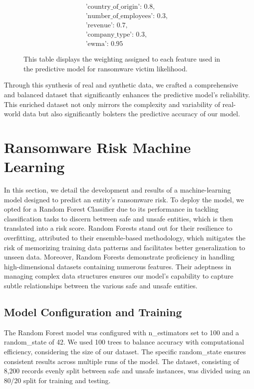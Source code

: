 \documentclass[running heads]{llncs}
\begin{document}
\begin{figure}[ht]
\centering
\[
\begin{array}{l}
\text{{'country\_of\_origin': }} 0.8, \\
\text{{'number\_of\_employees': }} 0.3, \\
\text{{'revenue': }} 0.7, \\
\text{{'company\_type': }} 0.3, \\
\text{{'ewma': }} 0.95
\end{array}
\]
\caption[Dataset Feature Weights]{This table displays the weighting assigned to each feature used in the predictive model for ransomware victim likelihood.}
  \label{tab:feature_weights}
\end{figure}

Through this synthesis of real and synthetic data, we crafted a comprehensive and balanced dataset that significantly enhances the predictive model's reliability. This enriched dataset not only mirrors the complexity and variability of real-world data but also significantly bolsters the predictive accuracy of our model. 

\section{Ransomware Risk Machine Learning}
\label{sec:analysis}
In this section, we detail the development and results of a machine-learning model designed to predict an entity's ransomware risk. To deploy the model, we opted for a Random Forest Classifier due to its performance in tackling classification tasks to discern between safe and unsafe entities, which is then translated into a risk score. Random Forests stand out for their resilience to overfitting, attributed to their ensemble-based methodology, which mitigates the risk of memorizing training data patterns and facilitates better generalization to unseen data. Moreover, Random Forests demonstrate proficiency in handling high-dimensional datasets containing numerous features. Their adeptness in managing complex data structures ensures our model's capability to capture subtle relationships between the various safe and unsafe entities.

\subsection{Model Configuration and Training}
The Random Forest model was configured with n\_estimators set to 100 and a random\_state of 42. We used 100 trees to balance accuracy with computational efficiency, considering the size of our dataset. The specific random\_state ensures consistent results across multiple runs of the model. The dataset, consisting of 8,200 records evenly split between safe and unsafe instances, was divided using an 80/20 split for training and testing.
\end{document}
